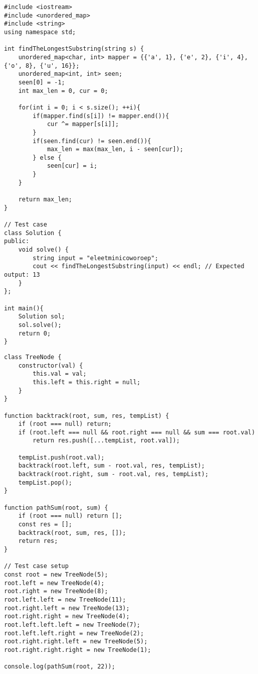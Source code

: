 \begin{tcolorbox}[left=0mm,right=0mm,top=0mm,bottom=0mm,boxsep=1mm,arc=0mm,boxrule=0pt, frame empty, breakable]
    \small
    \begin{lstlisting}
#include <iostream>
#include <unordered_map>
#include <string>
using namespace std;

int findTheLongestSubstring(string s) {
    unordered_map<char, int> mapper = {{'a', 1}, {'e', 2}, {'i', 4}, {'o', 8}, {'u', 16}};
    unordered_map<int, int> seen;
    seen[0] = -1;
    int max_len = 0, cur = 0;

    for(int i = 0; i < s.size(); ++i){
        if(mapper.find(s[i]) != mapper.end()){
            cur ^= mapper[s[i]];
        }
        if(seen.find(cur) != seen.end()){
            max_len = max(max_len, i - seen[cur]);
        } else {
            seen[cur] = i;
        }
    }

    return max_len;
}

// Test case
class Solution {
public:
    void solve() {
        string input = "eleetminicoworoep";
        cout << findTheLongestSubstring(input) << endl; // Expected output: 13
    }
};

int main(){
    Solution sol;
    sol.solve();
    return 0;
}
\end{lstlisting}
\end{tcolorbox}


\begin{tcolorbox}[left=0mm,right=0mm,top=0mm,bottom=0mm,boxsep=1mm,arc=0mm,boxrule=0pt, frame empty, breakable]
    \small
    \begin{lstlisting}
class TreeNode {
    constructor(val) {
        this.val = val;
        this.left = this.right = null;
    }
}

function backtrack(root, sum, res, tempList) {
    if (root === null) return;
    if (root.left === null && root.right === null && sum === root.val)
        return res.push([...tempList, root.val]);

    tempList.push(root.val);
    backtrack(root.left, sum - root.val, res, tempList);
    backtrack(root.right, sum - root.val, res, tempList);
    tempList.pop();
}

function pathSum(root, sum) {
    if (root === null) return [];
    const res = [];
    backtrack(root, sum, res, []);
    return res;
}

// Test case setup
const root = new TreeNode(5);
root.left = new TreeNode(4);
root.right = new TreeNode(8);
root.left.left = new TreeNode(11);
root.right.left = new TreeNode(13);
root.right.right = new TreeNode(4);
root.left.left.left = new TreeNode(7);
root.left.left.right = new TreeNode(2);
root.right.right.left = new TreeNode(5);
root.right.right.right = new TreeNode(1);

console.log(pathSum(root, 22));
\end{lstlisting}
\end{tcolorbox}



